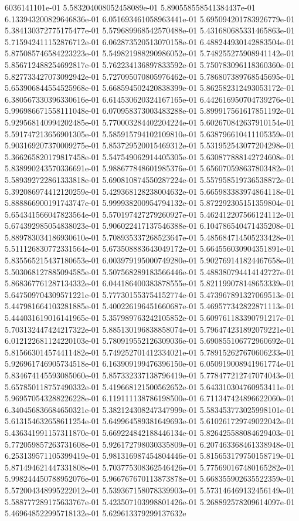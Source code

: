 6036141101e-01	5.583204008052458089e-01	5.890558558541384437e-01	6.133943200829646836e-01	6.051693461058963441e-01	5.695094201783926779e-01	5.384130372775175477e-01	5.579689968542570488e-01	5.431680685331465863e-01	5.715942411152876712e-01	6.062873520513070158e-01	6.488244930142883504e-01	5.875085746584223223e-01	5.549821988290986052e-01	5.748255275908941142e-01	5.856712488254692817e-01	5.762234136897833592e-01	5.750783096118360360e-01	5.827733427073092942e-01	5.727095070805976462e-01	5.786807389768545695e-01	5.653906844554525968e-01	5.668594502420838399e-01	5.862582312493053172e-01	6.380567330396330616e-01	6.614530620324167165e-01	6.442616950704739276e-01	5.996986671558111048e-01	6.070958373003483288e-01	5.899917561617851192e-01	5.929568140994202485e-01	5.770003284402204224e-01	5.602670842637910154e-01	5.591747213656901305e-01	5.585915794102109810e-01	5.638796610411105359e-01	5.903169207370009275e-01	5.853729520015469312e-01	5.531952543077204298e-01	5.366265820179817458e-01	5.547549062914405305e-01	5.630877888142724608e-01	5.838990243570336691e-01	5.988677848601985376e-01	5.656070598637803482e-01	5.589392722861333818e-01	5.690810874550287224e-01	5.557958519736538872e-01	5.392086974412120259e-01	5.429368128238004632e-01	5.665983383974864118e-01	5.888866900191743747e-01	5.999938200954794132e-01	5.872292305151359804e-01	5.654341566047823564e-01	5.570197427279260927e-01	5.462412207566124112e-01	5.674392985054838023e-01	5.906022417137546388e-01	6.104786540471435208e-01	5.889783034186930610e-01	5.708935337268523647e-01	5.485684714505233428e-01	5.511126830772331564e-01	5.673508883643049172e-01	5.664556030904351891e-01	5.835565215437180653e-01	6.003979195000749280e-01	5.902769141824467658e-01	5.503068127885094585e-01	5.507568289183566446e-01	5.488380794414142727e-01	5.868367761287134332e-01	6.044186400383878555e-01	5.821199078148653339e-01	5.647509704309571221e-01	5.777301553754152774e-01	5.473967891327069513e-01	5.447981664103281885e-01	5.400226196451660687e-01	5.469577342822871113e-01	5.444031619016141965e-01	5.357989763242105852e-01	5.609761183390791217e-01	5.703132447424217322e-01	5.885130196838858074e-01	5.796474231892079221e-01	6.012122681124220103e-01	5.780919552126309036e-01	5.690855106772960692e-01	5.815663014574411482e-01	5.749252701412334021e-01	5.789152627670606233e-01	5.926961746905734518e-01	6.163909199476396150e-01	6.050919008941961774e-01	5.834674145593085060e-01	5.857332337138796419e-01	5.778477212747074043e-01	5.657850118757490332e-01	5.419668121500562652e-01	5.643310304760953411e-01	5.969570543288226228e-01	6.119111138786198500e-01	6.711347424896622060e-01	6.340456836684650321e-01	5.382124308247347999e-01	5.583453773025998101e-01	5.613154632658611254e-01	5.649964589381649693e-01	5.610261729749022042e-01	5.436341991157311870e-01	5.669224842188446134e-01	5.826425588084629403e-01	5.772059857263731608e-01	5.926172798030335809e-01	6.207463368461338948e-01	6.253139571105399419e-01	5.981316987454804446e-01	5.815653179750158719e-01	5.871494621447331808e-01	5.703775308362546426e-01	5.775690167480165282e-01	5.998244450788952076e-01	5.966767670113873878e-01	5.668355902635522359e-01	5.572004348995222012e-01	5.539367158078339903e-01	5.573146469132456149e-01	5.588777289175633767e-01	5.423507103998801426e-01	5.268892578209614097e-01	5.469648522995718132e-01	5.629613379299137632e